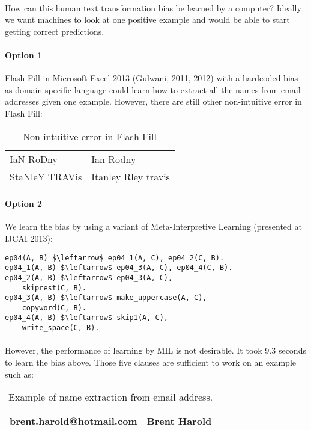 \documentclass{article}
\theoremstyle{plain}
\theoremstyle{definition}
\begin{document}
\begin{multicols}{2}
\paragraph{} How can this human text transformation bias be learned by a computer? Ideally we want machines to look at one positive example and would be able to start getting correct predictions.

\paragraph{Option 1} Flash Fill in Microsoft Excel 2013 (Gulwani, 2011, 2012) with a hardcoded bias as domain-specific language could learn how to extract all the names from email addresses given one example. However, there are still other non-intuitive error in Flash Fill:

\begin{table}[H]
\centering\footnotesize
\begin{tabular}{ | l | l | }
\hline
IaN RoDny & Ian Rodny \\
StaNleY TRAVis & Itanley Rley travis\\
\hline
\end{tabular}
\caption{Non-intuitive error in Flash Fill}\label{table:Flashfill}
\end{table}

\paragraph{Option 2} We learn the bias by using a variant of Meta-Interpretive Learning (presented at IJCAI 2013):

\begin{lstlisting}[mathescape=true]
ep04(A, B) $\leftarrow$ ep04_1(A, C), ep04_2(C, B).
ep04_1(A, B) $\leftarrow$ ep04_3(A, C), ep04_4(C, B).
ep04_2(A, B) $\leftarrow$ ep04_3(A, C),
	skiprest(C, B).
ep04_3(A, B) $\leftarrow$ make_uppercase(A, C),
	copyword(C, B).
ep04_4(A, B) $\leftarrow$ skip1(A, C),
	write_space(C, B).
\end{lstlisting}

\paragraph{} However, the performance of learning by MIL is not desirable. It took 9.3 seconds to learn the bias above. Those five clauses are sufficient to work on an example such as:

\begin{table}[H]
\centering\footnotesize
\begin{tabular}{ | l | l | }
\hline
brent.harold@hotmail.com & Brent Harold\\
\hline
\end{tabular}
\caption{Example of name extraction from email address.}\label{table:Flashfill}
\end{table}


\end{multicols}
\end{document}
